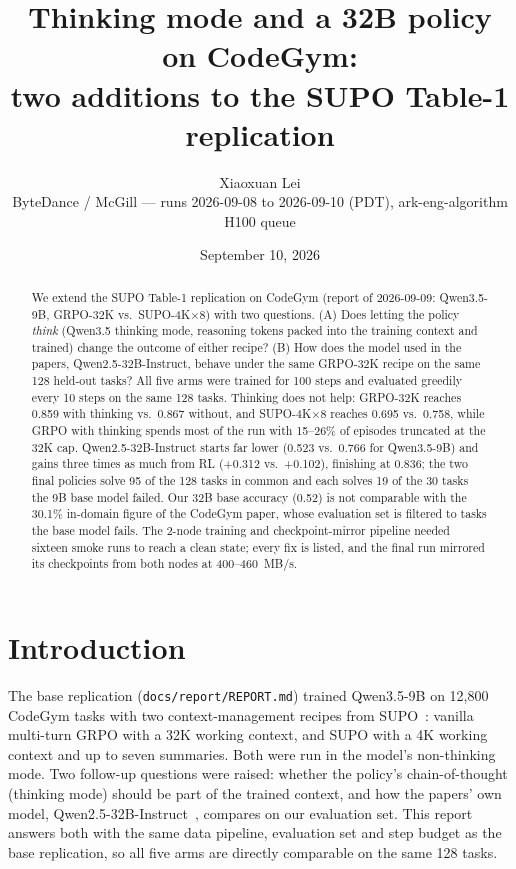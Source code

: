 \documentclass[11pt]{article}
\title{Thinking mode and a 32B policy on CodeGym:\\two additions to the SUPO Table-1 replication}
\author{Xiaoxuan Lei \\ \small ByteDance / McGill --- runs 2026-09-08 to 2026-09-10 (PDT), ark-eng-algorithm H100 queue}
\date{September 10, 2026}
\newcommand{\p}[1]{\texttt{#1}}
\begin{document}
\maketitle

\begin{abstract}
We extend the SUPO Table-1 replication on CodeGym (report of 2026-09-09: Qwen3.5-9B, GRPO-32K vs.\ SUPO-4K$\times$8) with two questions.
(A) Does letting the policy \emph{think} (Qwen3.5 thinking mode, reasoning tokens packed into the training context and trained) change the outcome of either recipe?
(B) How does the model used in the papers, Qwen2.5-32B-Instruct, behave under the same GRPO-32K recipe on the same 128 held-out tasks?
All five arms were trained for 100 steps and evaluated greedily every 10 steps on the same 128 tasks.
Thinking does not help: GRPO-32K reaches 0.859 with thinking vs.\ 0.867 without, and SUPO-4K$\times$8 reaches 0.695 vs.\ 0.758, while GRPO with thinking spends most of the run with 15--26\% of episodes truncated at the 32K cap.
Qwen2.5-32B-Instruct starts far lower (0.523 vs.\ 0.766 for Qwen3.5-9B) and gains three times as much from RL (+0.312 vs.\ +0.102), finishing at 0.836; the two final policies solve 95 of the 128 tasks in common and each solves 19 of the 30 tasks the 9B base model failed.
Our 32B base accuracy (0.52) is not comparable with the 30.1\% in-domain figure of the CodeGym paper, whose evaluation set is filtered to tasks the base model fails.
The 2-node training and checkpoint-mirror pipeline needed sixteen smoke runs to reach a clean state; every fix is listed, and the final run mirrored its checkpoints from both nodes at 400--460~MB/s.
\end{abstract}

\section{Introduction}
The base replication (\p{docs/report/REPORT.md}) trained Qwen3.5-9B on 12{,}800 CodeGym tasks with two context-management recipes from SUPO~\cite{supo}: vanilla multi-turn GRPO with a 32K working context, and SUPO with a 4K working context and up to seven summaries.
Both were run in the model's non-thinking mode.
Two follow-up questions were raised: whether the policy's chain-of-thought (thinking mode) should be part of the trained context, and how the papers' own model, Qwen2.5-32B-Instruct~\cite{codegym}, compares on our evaluation set.
This report answers both with the same data pipeline, evaluation set and step budget as the base replication, so all five arms are directly comparable on the same 128 tasks.
\end{document}
